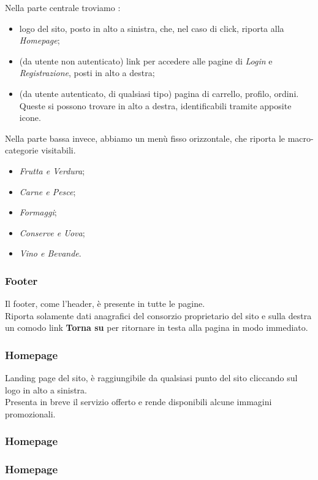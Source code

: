 		Nella parte centrale troviamo :
		\begin{itemize}
			\item logo del sito, posto in alto a sinistra, che, nel caso di click, riporta alla \textit{Homepage};
			\item (da utente non autenticato) link per accedere alle pagine di \textit{Login} e \textit{Registrazione}, posti in alto a destra;
			\item (da utente autenticato, di qualsiasi tipo) pagina di carrello, profilo, ordini. Queste si possono trovare in alto a destra, identificabili tramite apposite icone.
		\end{itemize} 
		
		Nella parte bassa invece, abbiamo un menù fisso orizzontale, che riporta le macro-categorie visitabili.
		\begin{itemize}
			\item \textit{Frutta e Verdura};
			\item \textit{Carne e Pesce};
			\item \textit{Formaggi};
			\item \textit{Conserve e Uova};
			\item \textit{Vino e Bevande}.
		\end{itemize}
	
	\subsubsection{Footer}
	Il footer, come l'header, è presente in tutte le pagine.\\
	Riporta solamente dati anagrafici del consorzio proprietario del sito e sulla destra un comodo link \textbf{Torna su} per ritornare in testa alla pagina in modo immediato.
	\subsubsection{Homepage}
	Landing page del sito, è raggiungibile da qualsiasi punto del sito cliccando sul logo in alto a sinistra.\\
	Presenta in breve il servizio offerto e rende disponibili alcune immagini promozionali.\\
	\subsubsection{Homepage}
	\subsubsection{Homepage}
